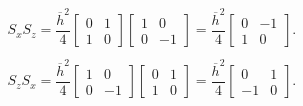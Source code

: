 \begin{enumerate}[label=\color{red}\textbf{\arabic*)}]
\begin{enumerate}[label=\arabic*)]
$\begin{array}{l}
        S_xS_z=\dfrac{\overline{h}^2}{4}\begin{bmatrix} 
            0 & 1\\
            1 & 0
        \end{bmatrix}\begin{bmatrix} 
            1 & 0\\
            0 & -1
        \end{bmatrix} =\dfrac{\overline{h}^2}{4}\begin{bmatrix} 
            0 & -1\\
            1 & 0
        \end{bmatrix} .\\ \\
        S_zS_x=\dfrac{\overline{h}^2}{4}\begin{bmatrix} 
            1 & 0\\
            0 & -1
        \end{bmatrix} \begin{bmatrix} 
            0 & 1\\
            1 & 0
        \end{bmatrix} =\dfrac{\overline{h}^2}{4}\begin{bmatrix} 
            0 & 1\\
            -1 & 0
        \end{bmatrix} .
    \end{array}$
\end{enumerate}


\end{enumerate}
